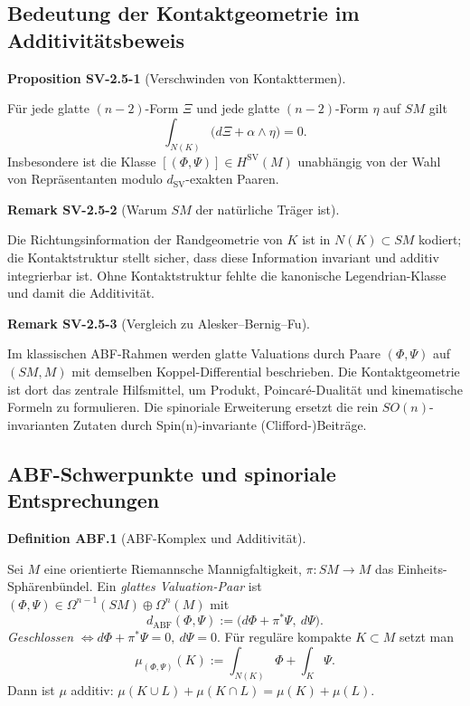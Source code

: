 \documentclass[10pt, letterpaper]{article}
\newcommand{\CustomHeading}[3]{%
  \par\medskip\noindent%
  \textbf{#1 #2} \textnormal{(#3)}.\enskip%
}
\newenvironment{DEF}[2]{\begin{unitbox}\CustomHeading{Definition}{#1}{#2}}{\end{unitbox}}
\newenvironment{PROP}[2]{\begin{unitbox}\CustomHeading{Proposition}{#1}{#2}}{\end{unitbox}}
\newenvironment{REM}[2]{\begin{unitbox}\CustomHeading{Remark}{#1}{#2}}{\end{unitbox}}
\begin{document}
\subsection{Bedeutung der Kontaktgeometrie im Additivitätsbeweis}\label{subsec:SV-2.5}

\begin{PROP}{SV-2.5-1}{Verschwinden von Kontakttermen}
Für jede glatte $(n-2)$-Form $\Xi$ und jede glatte $(n-2)$-Form $\eta$ auf $SM$ gilt
\[
\int_{N(K)}\big(d\Xi+\alpha\wedge \eta\big)=0.
\]
Insbesondere ist die Klasse $[(\Phi,\Psi)]\in H^{\operatorname{SV}}(M)$ unabhängig von der Wahl von Repräsentanten modulo $d_{\operatorname{SV}}$-exakten Paaren.
\end{PROP}

\begin{REM}{SV-2.5-2}{Warum $SM$ der natürliche Träger ist}
Die Richtungsinformation der Randgeometrie von $K$ ist in $N(K)\subset SM$ kodiert; die Kontaktstruktur stellt sicher, dass diese Information invariant und additiv integrierbar ist. Ohne Kontaktstruktur fehlte die kanonische Legendrian-Klasse und damit die Additivität.
\end{REM}

\begin{REM}{SV-2.5-3}{Vergleich zu Alesker–Bernig–Fu}
Im klassischen ABF-Rahmen werden glatte Valuations durch Paare $(\Phi,\Psi)$ auf $(SM,M)$ mit demselben Koppel-Differential beschrieben. Die Kontaktgeometrie ist dort das zentrale Hilfsmittel, um Produkt, Poincaré-Dualität und kinematische Formeln zu formulieren. Die spinoriale Erweiterung ersetzt die rein $SO(n)$-invarianten Zutaten durch Spin(n)-invariante (Clifford-)Beiträge.
\end{REM}




\pagebreak


\subsection{ABF-Schwerpunkte und spinoriale Entsprechungen}\label{subsec:ABF-to-SV}

\begin{DEF}{ABF.1}{ABF-Komplex und Additivität}
Sei $M$ eine orientierte Riemannsche Mannigfaltigkeit, $\pi:SM\to M$ das Einheits-Sphärenbündel.
Ein \emph{glattes Valuation-Paar} ist $(\Phi,\Psi)\in\Omega^{n-1}(SM)\oplus\Omega^{n}(M)$ mit
\[
d_{\mathrm{ABF}}(\Phi,\Psi):=\big(d\Phi+\pi^*\Psi,\ d\Psi\big).
\]
\emph{Geschlossen} $\iff d\Phi+\pi^*\Psi=0,\ d\Psi=0$. Für reguläre kompakte $K\subset M$ setzt man
\[
\mu_{(\Phi,\Psi)}(K):=\int_{N(K)}\Phi+\int_K\Psi.
\]
Dann ist $\mu$ additiv: $\mu(K\cup L)+\mu(K\cap L)=\mu(K)+\mu(L)$.
\end{DEF}
\end{document}

